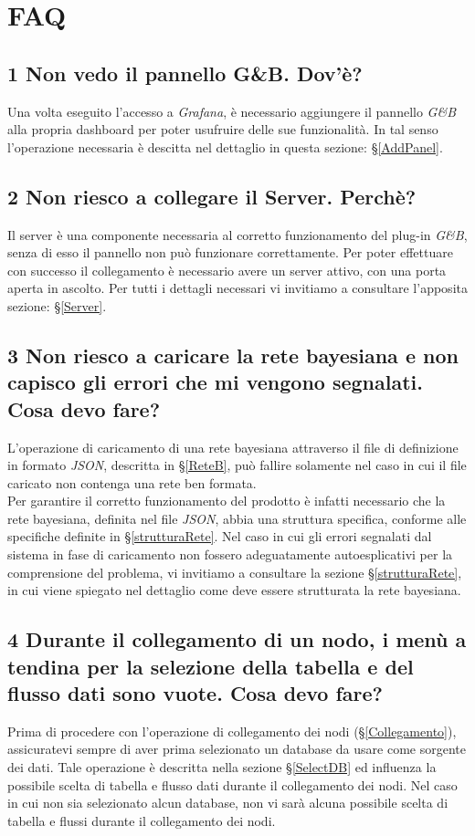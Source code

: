 \section{FAQ}\label{FAQ}


\subsection*{1 Non vedo il pannello G\&B. Dov'è?}
Una volta eseguito l'accesso a \textit{Grafana}, è necessario aggiungere il pannello \textit{G\&B} alla propria dashboard per poter usufruire delle sue funzionalità. In tal senso l'operazione necessaria è descitta nel dettaglio in questa sezione: §\ref{AddPanel}.

\subsection*{2 Non riesco a collegare il Server. Perchè?}
Il server è una componente necessaria al corretto funzionamento del plug-in \textit{G\&B}, senza di esso il pannello non può funzionare correttamente. Per poter effettuare con successo il collegamento è necessario avere un server attivo, con una porta aperta in ascolto. Per tutti i dettagli necessari vi invitiamo a consultare l'apposita sezione: §\ref{Server}.

\subsection*{3 Non riesco a caricare la rete bayesiana e non capisco gli errori che mi vengono segnalati. Cosa devo fare?}
L'operazione di caricamento di una rete bayesiana attraverso il file di definizione in formato \textit{JSON}, descritta in §\ref{ReteB}, può fallire solamente nel caso in cui il file caricato non contenga una rete ben formata.\\
Per garantire il corretto funzionamento del prodotto è infatti necessario che la rete bayesiana, definita nel file \textit{JSON}, abbia una struttura specifica, conforme alle specifiche definite in §\ref{strutturaRete}. Nel caso in cui gli errori segnalati dal sistema in fase di caricamento non fossero adeguatamente autoesplicativi per la comprensione del problema, vi invitiamo a consultare la sezione §\ref{strutturaRete}, in cui viene spiegato nel dettaglio come deve essere strutturata la rete bayesiana.

\subsection*{4 Durante il collegamento di un nodo, i menù a tendina per la selezione della tabella e del flusso dati sono vuote. Cosa devo fare?}
Prima di procedere con l'operazione di collegamento dei nodi (§\ref{Collegamento}), assicuratevi sempre di aver prima selezionato un database da usare come sorgente dei dati. Tale operazione è descritta nella sezione §\ref{SelectDB} ed influenza la possibile scelta di tabella e flusso dati durante il collegamento dei nodi. Nel caso in cui non sia selezionato alcun database, non vi sarà alcuna possibile scelta di tabella e flussi durante il collegamento dei nodi.

